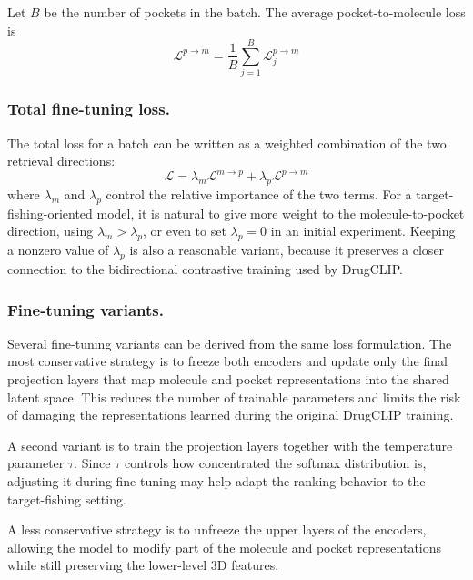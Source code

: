 \documentclass[12pt,fleqn]{article}
\begin{document}
Let $B$ be the number of pockets in the batch. The average
pocket-to-molecule loss is
\begin{equation}
  \label{eq:batch-p2m}
  \mathcal{L}^{p \rightarrow m}
  =
  \frac{1}{B}
  \sum_{j=1}^{B}
  \mathcal{L}^{p \rightarrow m}_{j}
\end{equation}

\subsubsection{Total fine-tuning loss.}
\label{sec:total-finetuning-loss}

The total loss for a batch can be written as a weighted combination of
the two retrieval directions:
\begin{equation}
  \label{eq:total-loss}
  \mathcal{L}
  =
  \lambda_m \mathcal{L}^{m \rightarrow p}
  +
  \lambda_p \mathcal{L}^{p \rightarrow m}
\end{equation}
where $\lambda_m$ and $\lambda_p$ control the relative importance of
the two terms. For a target-fishing-oriented model, it is natural to
give more weight to the molecule-to-pocket direction, using
$\lambda_m > \lambda_p$, or even to set $\lambda_p=0$ in an initial
experiment. Keeping a nonzero value of $\lambda_p$ is also a
reasonable variant, because it preserves a closer connection to the
bidirectional contrastive training used by DrugCLIP.

\subsubsection{Fine-tuning variants.}
\label{sec:fine-tuning-variants}

Several fine-tuning variants can be derived from the same loss
formulation. The most conservative strategy is to freeze both encoders
and update only the final projection layers that map molecule and
pocket representations into the shared latent space. This reduces the
number of trainable parameters and limits the risk of damaging the
representations learned during the original DrugCLIP training.

A second variant is to train the projection layers together with the
temperature parameter $\tau$. Since $\tau$ controls how concentrated
the softmax distribution is, adjusting it during fine-tuning may help
adapt the ranking behavior to the target-fishing setting.

A less conservative strategy is to unfreeze the upper layers of the
encoders, allowing the model to modify part of the molecule and pocket
representations while still preserving the lower-level 3D features.
\end{document}

